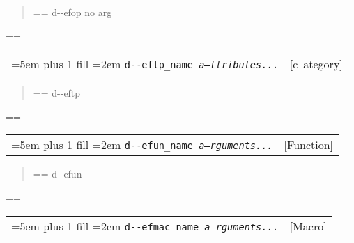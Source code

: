 \documentclass{book}
\makeatletter
\newenvironment{GNUTexinfopreformatted}{%
  \par\GNUTobeylines\obeyspaces\frenchspacing
  \parskip=\z@\parindent=\z@}{}
{\catcode`\^^M=13 \gdef\GNUTobeylines{\catcode`\^^M=13 \def^^M{\null\par}}}
\newenvironment{GNUTexinfoindented}
  {\begin{list}{}{}
  \item\relax}
  {\end{list}}
\makeatother
\begin{document}
\begin{GNUTexinfoindented}
%
\begin{quote}
\unskip{\parskip=0pt\noindent}%
\begin{GNUTexinfopreformatted}%
\ttfamily d{-}{-}efop no arg
\end{GNUTexinfopreformatted}
\end{quote}
\begin{GNUTexinfopreformatted}%
\ttfamily 
\end{GNUTexinfopreformatted}

\noindent\begin{tabularx}{\linewidth}{@{}Xr}
\rightskip=5em plus 1 fill
\hangindent=2em
\texttt{d{-}{-}eftp\_name \EmbracOn{}\textnormal{\textsl{a--ttributes...}}\EmbracOff{}}& [c--ategory]
\end{tabularx}

%
\begin{quote}
\unskip{\parskip=0pt\noindent}%
\begin{GNUTexinfopreformatted}%
\ttfamily d{-}{-}eftp
\end{GNUTexinfopreformatted}
\end{quote}
\begin{GNUTexinfopreformatted}%
\ttfamily 
\end{GNUTexinfopreformatted}

\noindent\begin{tabularx}{\linewidth}{@{}Xr}
\rightskip=5em plus 1 fill
\hangindent=2em
\texttt{d{-}{-}efun\_name \EmbracOn{}\textnormal{\textsl{a--rguments...}}\EmbracOff{}}& [Function]
\end{tabularx}

%
\begin{quote}
\unskip{\parskip=0pt\noindent}%
\begin{GNUTexinfopreformatted}%
\ttfamily d{-}{-}efun
\end{GNUTexinfopreformatted}
\end{quote}
\begin{GNUTexinfopreformatted}%
\ttfamily 
\end{GNUTexinfopreformatted}

\noindent\begin{tabularx}{\linewidth}{@{}Xr}
\rightskip=5em plus 1 fill
\hangindent=2em
\texttt{d{-}{-}efmac\_name \EmbracOn{}\textnormal{\textsl{a--rguments...}}\EmbracOff{}}& [Macro]
\end{tabularx}


\end{GNUTexinfoindented}
\end{document}
